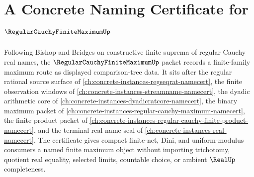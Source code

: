 \chapter{A Concrete Naming Certificate for $\RegularCauchyFiniteMaximumUp$}
\label{ch:concrete-instances-regular-cauchy-finite-maximum-namecert}

Following Bishop and Bridges on constructive finite suprema of regular Cauchy real names, the $\RegularCauchyFiniteMaximumUp$ packet records a finite-family maximum route as displayed comparison-tree data. It sits after the regular rational source surface of \autoref{ch:concrete-instances-regseqrat-namecert}, the finite observation windows of \autoref{ch:concrete-instances-streamname-namecert}, the dyadic arithmetic core of \autoref{ch:concrete-instances-dyadicratcore-namecert}, the binary maximum packet of \autoref{ch:concrete-instances-regular-cauchy-maximum-namecert}, the finite product packet of \autoref{ch:concrete-instances-regular-cauchy-finite-product-namecert}, and the terminal real-name seal of \autoref{ch:concrete-instances-real-namecert}. The certificate gives compact finite-net, Dini, and uniform-modulus consumers a named finite maximum object without importing trichotomy, quotient real equality, selected limits, countable choice, or ambient $\RealUp$ completeness.

